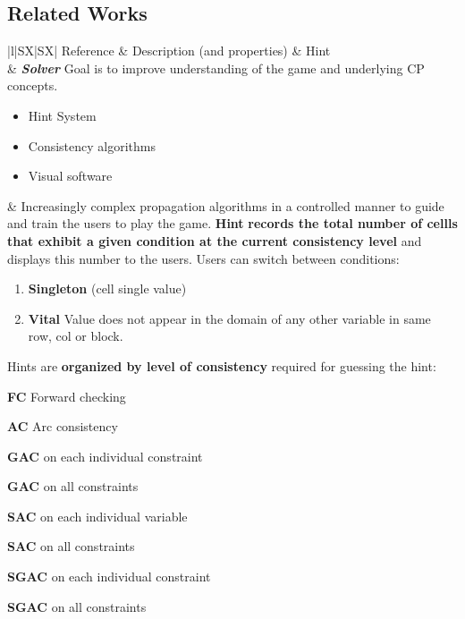 \documentclass[a4paper,UKenglish,cleveref, autoref, thm-restate]{lipics-v2021}
\begin{document}
\newpage
\begin{landscape}
\section{Related Works}

\begin{table}[!h]
\begin{tabularx}{\linewidth}{|l|S{X}|S{X}|}
\Xhline{1.5pt}
	Reference & Description (and properties) & Hint \\
	\Xhline{1.5pt}
	\cite{reeson2007interactive} & \textbf{\textit{Solver}} Goal is to improve understanding of the game and underlying CP concepts. 
	\begin{itemize}
		\item Hint System
		\item Consistency algorithms
		\item Visual software
	\end{itemize} & Increasingly complex propagation algorithms in a controlled manner to guide and train the users to play the game. 
	\textbf{Hint} \textbf{records the total number of cellls that exhibit a given condition at the current consistency level} and displays this number to the users. Users can switch between conditions:
	\begin{enumerate}
		\item \textbf{Singleton} (cell single value)
		\item \textbf{Vital} Value does not appear in the domain of any other variable in same row, col or block.
	\end{enumerate}
	Hints are \textbf{organized by level of consistency} required for guessing the hint: 
		\begin{inparaenum}[(1)]
			\item \textbf{FC} Forward checking
			\item \textbf{AC} Arc consistency
			\item \textbf{GAC }on each individual constraint
			\item \textbf{GAC }on all constraints
			\item \textbf{SAC }on each individual variable
			\item \textbf{SAC }on all constraints
			\item \textbf{SGAC }on each individual constraint
			\item \textbf{SGAC }on all constraints
		\end{inparaenum}\\	\hline
\end{tabularx}
\end{table}


\end{landscape}
\end{document}
